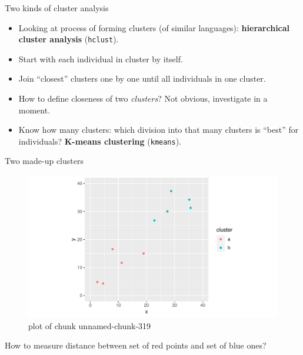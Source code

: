 \documentclass[ignorenonframetext,]{beamer}
\begin{document}
\begin{frame}[fragile]{Two kinds of cluster analysis}
\protect\hypertarget{two-kinds-of-cluster-analysis}{}

\begin{itemize}
\item
  Looking at process of forming clusters (of similar languages):
  \textbf{hierarchical cluster analysis} (\texttt{hclust}).
\item
  Start with each individual in cluster by itself.
\item
  Join ``closest'' clusters one by one until all individuals in one
  cluster.
\item
  How to define closeness of two \emph{clusters}? Not obvious,
  investigate in a moment.
\item
  Know how many clusters: which division into that many clusters is
  ``best'' for individuals? \textbf{K-means clustering}
  (\texttt{kmeans}).
\end{itemize}

\end{frame}

\begin{frame}{Two made-up clusters}
\protect\hypertarget{two-made-up-clusters}{}

\begin{figure}
\centering
\includegraphics{figure/unnamed-chunk-319-1.pdf}
\caption{plot of chunk unnamed-chunk-319}
\end{figure}

How to measure distance between set of red points and set of blue ones?

\end{frame}
\end{document}
